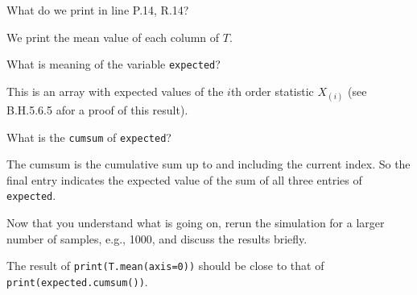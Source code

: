 \begin{exercise}
What do we print in line P.14, R.14?
\begin{solution}
We print the mean value of each column of $T$.
\end{solution}
\end{exercise}

\begin{exercise}
What is meaning of the variable \texttt{expected}?
\begin{solution}
This is an array with expected values of the $i$th order statistic $X_{(i)}$ (see B.H.5.6.5 afor a proof of this result).
\end{solution}
\end{exercise}

\begin{exercise}
 What is the \texttt{cumsum} of \texttt{expected}?
\begin{solution}
The cumsum is the cumulative sum up to and including the current index. So the final entry indicates the expected value of the sum of all three entries of \verb|expected|.
\end{solution}
\end{exercise}

\begin{exercise}
 Now that you understand what is going on, rerun the simulation for a larger number of samples, e.g., 1000, and discuss the results briefly.
\begin{solution}
The result of \verb|print(T.mean(axis=0))| should be close to that of \verb|print(expected.cumsum())|.
\end{solution}
\end{exercise}
